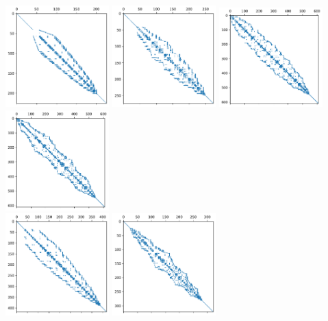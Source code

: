 \begin{center}
\includegraphics[width=4cm]{python_codes/fieldstone_78/results/spy/A_aft_topo0.pdf}
\includegraphics[width=4cm]{python_codes/fieldstone_78/results/spy/A_aft_topo1.pdf}
\includegraphics[width=4cm]{python_codes/fieldstone_78/results/spy/A_aft_topo2.pdf}
\includegraphics[width=4cm]{python_codes/fieldstone_78/results/spy/A_aft_topo3.pdf}\\
\includegraphics[width=4cm]{python_codes/fieldstone_78/results/spy/A_aft_topo4.pdf}
\includegraphics[width=4cm]{python_codes/fieldstone_78/results/spy/A_aft_topo5.pdf}

\end{center}
